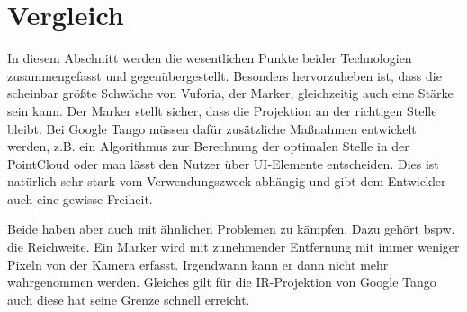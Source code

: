 
\section{Vergleich}
In diesem Abschnitt werden die wesentlichen Punkte beider Technologien zusammengefasst und gegenübergestellt. Besonders hervorzuheben ist, dass die scheinbar größte Schwäche von Vuforia, der Marker, gleichzeitig auch eine Stärke sein kann. Der Marker stellt sicher, dass die Projektion an der richtigen Stelle bleibt. Bei Google Tango müssen dafür zusätzliche Maßnahmen entwickelt werden, z.B. ein Algorithmus zur Berechnung der optimalen Stelle in der PointCloud oder man lässt den Nutzer über UI-Elemente entscheiden. Dies ist natürlich sehr stark vom Verwendungszweck abhängig und gibt dem Entwickler auch eine gewisse Freiheit.\par
Beide haben aber auch mit ähnlichen Problemen zu kämpfen. Dazu gehört bspw. die Reichweite. Ein Marker wird mit zunehmender Entfernung mit immer weniger Pixeln von der Kamera erfasst. Irgendwann kann er dann nicht mehr wahrgenommen werden. Gleiches gilt für die IR-Projektion von Google Tango auch diese hat seine Grenze schnell erreicht.

